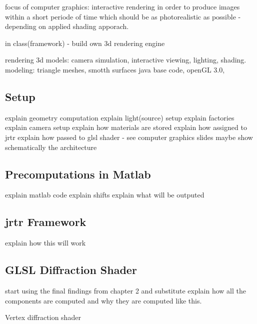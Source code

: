 focus of computer graphics: interactive rendering in order to produce images within a short periode of time which should be as photorealistic as possible - depending on applied shading apporach.


in class(framework) - build own 3d rendering engine

rendering 3d models: camera simulation, interactive viewing, lighting, shading. 
modeling: triangle meshes, smotth surfaces
java base code, openGL 3.0, 

\subsection{Setup}
explain geometry computation
explain light(source) setup
explain factories
explain camera setup
explain how materials are stored
explain how assigned to jrtr
explain how passed to glsl shader - see computer graphics slides
maybe show schematically the architecture
\subsection{Precomputations in Matlab}
explain matlab code
explain shifts
explain what will be outputed

\subsection{jrtr Framework}
explain how this will work
\subsection{GLSL Diffraction Shader}
start using the final findings from chapter 2 and substitute
explain how all the components are computed and why they are computed like this.

\begin{algorithm}
  \caption{Vertex diffraction shader}
  \begin{algorithmic}
    \EndFor
  \end{algorithmic}
\end{algorithm}

